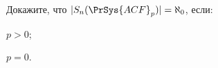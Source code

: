 Докажите, что $|S_n(\PrSys{ACF}_p)| = \aleph_0$, если:
\begin{enumcyr}
    \item $p > 0$;
    \item $p = 0$.
\end{enumcyr}